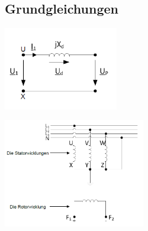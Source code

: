 \subsection{Grundgleichungen}
    \begin{minipage}[b]{0.5\linewidth}
        \includegraphics[width = 5cm]{images/Wicklung1}
    \end{minipage}
    \begin{minipage}[b]{0.5\linewidth}
        \includegraphics[width = 6.2cm]{images/Wicklungen}
    \end{minipage}
    \vspace{-1cm}
